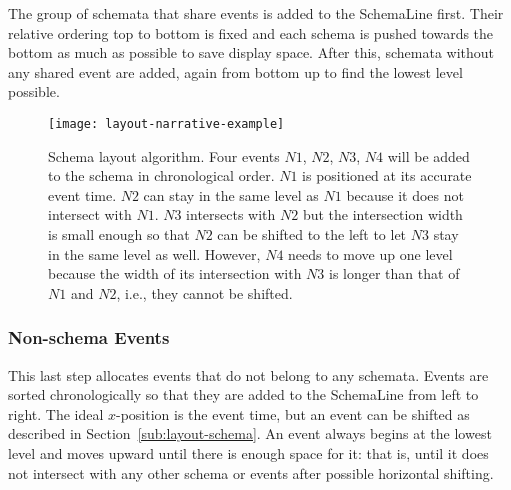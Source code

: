The group of schemata that share events is added to the SchemaLine first. Their relative ordering top to bottom is fixed and each schema is pushed towards the bottom as much as possible to save display space. After this, schemata without any shared event are added, again from bottom up to find the lowest level possible.

%
%	

\begin{figure}[ht]
\centering
\texttt{[image: layout-narrative-example]}
\caption{Schema layout algorithm. Four events $N1$, $N2$, $N3$, $N4$ will be added to the schema in chronological order. $N1$ is positioned at its accurate event time. $N2$ can stay in the same level as $N1$ because it does not intersect with $N1$. $N3$ intersects with $N2$ but the intersection width is small enough so that $N2$ can be shifted to the left to let $N3$ stay in the same level as well. However, $N4$ needs to move up one level because the width of its intersection with $N3$ is longer than that of $N1$ and $N2$, i.e., they cannot be shifted.}
\label{fig:layout-schema-example}
\end{figure}

\subsubsection{Non-schema Events}
\label{sub:layout-non-schema}
This last step allocates events that do not belong to any schemata. Events are sorted chronologically so that they are added to the SchemaLine from left to right. The ideal $x$-position is the event time, but an event can be shifted as described in Section~\ref{sub:layout-schema}. An event always begins at the lowest level and moves upward until there is enough space for it: that is, until it does not intersect with any other schema or events after possible horizontal shifting. 

